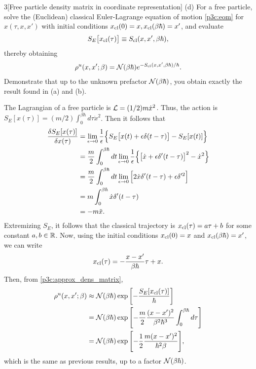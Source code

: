 \documentclass[12pt]{article}
\begin{document}
\begin{problem}{3}[Free particle density matrix in coordinate representation]
(d) For a free particle, solve the (Euclidean) classical Euler-Lagrange equation
of motion \cref{p3c:eom} for $x(\tau,x,x')$ with initial conditions
$x_{\text{cl}}(0)=x,x_{\text{cl}}(\beta\hbar)=x'$, and evaluate
\begin{equation}
    S_E\qty[x_{\text{cl}}(\tau)]\equiv S_{\text{cl}}(x,x',\beta\hbar), 
\end{equation}
thereby obtaining
\begin{equation}\label{p3d:dens_matrix}
    \rho^u(x,x';\beta)=\mathcal{N}(\beta\hbar)e^{-S_{\text{cl}}(x,x',\beta\hbar)/\hbar}. 
\end{equation}
Demonstrate that up to the unknown prefactor $\mathcal{N}(\beta\hbar)$, you obtain
exactly the result found in (a) and (b).
\begin{solution}
    The Lagrangian of a free particle is $\mathcal{L}=(1/2)m\dot{x}^2$. Thus, the action is 
$S_E[x(\tau)]=(m/2)\int_0^{\beta\hbar}d\tau\dot{x}^2$. Then it follows that
\begin{align}
    \frac{\delta S_E[x(\tau)]}{\delta x(\tau)}
    &=\lim_{\epsilon\to0}\frac1\epsilon\qty{S_E\qty[x(t)+\epsilon\delta(t-\tau)]-S_E[x(t)]}\notag\\
    &=\frac{m}{2}\int_0^{\beta\hbar}dt\lim_{\epsilon\to0}\frac1\epsilon
    \qty{\qty[\dot{x}+\epsilon\delta'(t-\tau)]^2-\dot{x}^2}\notag\\
    &=\frac{m}{2}\int_0^{\beta\hbar}dt\lim_{\epsilon\to0}
    \qty[2\dot{x}\delta'(t-\tau)+\epsilon\delta'^2]\notag\\
    &=m\int_0^{\beta\hbar}\dot{x}\delta'(t-\tau)\notag\\
    &=-m\ddot{x}.
\end{align}
Extremizing $S_E$, it follows that the classical trajectory
is $x_{\text{cl}}(\tau)=a\tau+b$ for some constant
$a,b\in\mathbb{R}$. Now, using the initial conditions $x_{\text{cl}}(0)=x$ and
$x_{\text{cl}}(\beta\hbar)=x'$, we can write
\begin{equation}
    x_{\text{cl}}(\tau)=-\frac{x-x'}{\beta\hbar}\tau+x .
\end{equation}
Then, from \eqref{p3c:approx_dens_matrix},
\begin{align}\label{p3d:rho}
    \rho^u(x,x';\beta)
    &\approx \mathcal{N}(\beta\hbar)\exp\qty[-\frac{S_E[x_{\text{cl}}(\tau)]}{\hbar}]\notag\\
    &=\mathcal{N}(\beta\hbar)\exp\qty[-\frac{m}{2}\frac{(x-x')^2}{\beta^2\hbar^3}\int_0^{\beta\hbar}d\tau]\notag\\
    &=\mathcal{N}(\beta\hbar)\exp\qty[-\frac12\frac{m(x-x')^2}{\hbar^2\beta}],
\end{align}
which is the same as previous results, up to a factor $\mathcal{N}(\beta\hbar)$.   
\end{solution}


\end{problem}
\end{document}
